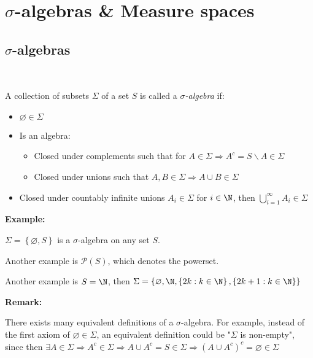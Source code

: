 \section{$\sigma$-algebras \& Measure spaces}
\subsection{$\sigma$-algebras}\hfill\\\par
\begin{defo}{}
  A collection of subsets $\Sigma$ of a set $S$ is called a $\sigma$\textit{-algebra} if:\par
  \begin{itemize}
    \item $\varnothing\in\Sigma$
    \item Is an algebra:\par
      \begin{itemize}
        \item Closed under complements such that for $A\in\Sigma\Rightarrow A^c = S\backslash A\in\Sigma$
      \item Closed under unions such that $A,B\in\Sigma\Rightarrow A\cup B\in\Sigma$
      \end{itemize}
    \item Closed under countably infinite unions $A_i\in\Sigma$ for $i\in\N$, then $\bigcup_{i=1}^{\infty}A_i\in\Sigma$
  \end{itemize}
\end{defo}
\par\bigskip
\noindent\textbf{Example:}\par
\noindent $\Sigma = \left\{\varnothing, S\right\}$ is a $\sigma$-algebra on any set $S$.\par
\noindent Another example is $\mathcal{P}(S)$, which denotes the powerset.\par
\noindent Another example is $S = \N$, then $\Sigma = \left\{\varnothing,\N, \left\{2k:k\in\N\right\},\left\{2k+1:k\in\N\right\}\right\}$
\par\bigskip
\noindent\textbf{Remark:}\par
\noindent There exists many equivalent definitions of a $\sigma$-algebra. For example, instead of the first axiom of $\varnothing\in\Sigma$, an equivalent definition could be "$\Sigma$ is non-empty", since then $\exists A\in\Sigma\Rightarrow A^c\in\Sigma\Rightarrow A\cup A^c = S \in\Sigma\Rightarrow (A\cup A^c)^c = \varnothing\in\Sigma$
\par\bigskip

